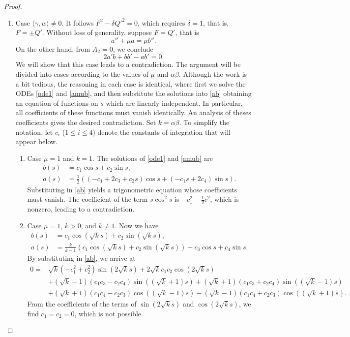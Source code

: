 \documentclass[a4paper,12pt]{amsart}
\theoremstyle{definition}
\begin{document}
\begin{proof}
\begin{enumerate}
\begin{enumerate}
\item Case  $\langle \gamma, w \rangle \neq 0$. It follows $F^2-\delta Q'^2=0$, which requires $\delta=1$, that is, $F=\pm Q'$. Without loss of generality, suppose $F=Q'$, that is
\begin{equation}
a''+\mu a=\mu b''. \label{amub}
\end{equation}
On the other hand, from $A_2=0$, we conclude
\begin{equation}
2a'b+bb'-ab'=0. \label{ab}
\end{equation}
We will show that this case leads to a contradiction. The argument will be divided into cases according to the values of $\mu$ and $\alpha\beta$. Although the work is a bit tedious, the reasoning in each case is identical, where first we   solve the ODEs \eqref{ode1} and \eqref{amub}, and then substitute the solutions into \eqref{ab} obtaining an equation of functions on $s$ which are linearly independent. In particular, all coefficients of these functions must vanish identically. An analysis of theses coefficients gives the desired contradiction. Set $k=\alpha\beta$. To simplify the notation, let $c_i$ ($1 \leq i \leq 4$) denote the constants of integration that will appear below.
\begin{enumerate}
\item Case $\mu=1$ and $k=1$. The solutions of \eqref{ode1} and \eqref{amub} are
\begin{equation*}
\begin{split}
b(s)&=c_1\cos s+c_2 \sin s,\\
a(s)&=\frac12 ((-c_1+2c_3+c_2s)\cos s+(-c_1s+2c_4)\sin s).
\end{split}
\end{equation*}
Substituting   in \eqref{ab} yields a trigonometric equation whose coefficients must vanish. The coefficient of the term $s \cos^2 s$ is $-c_1^2-\frac12 c^2$, which is nonzero, leading to a contradiction.

\item Case $\mu=1$, $k >0$, and $k\neq1$. Now we have
\begin{equation*}
\begin{split}
 b(s)&=c_1\cos (\sqrt{k}s)+c_2 \sin (\sqrt{k}s),\\
a(s)&=\frac{k }{k-1}(c_1 \cos (\sqrt{k} s)+c_2 \sin (\sqrt{k} s))+c_3 \cos s+c_4 \sin s.
\end{split}
\end{equation*}
By substituting   in \eqref{ab}, we arrive at
$$
\begin{aligned}
0=& \sqrt{k}(-c_1^2+c_2^2)\sin(2\sqrt{k}s)
+ 2\sqrt{k}c_1c_2\cos(2\sqrt{k}s) \\
&+ (\sqrt{k}-1)(c_1c_3-c_2c_4)\sin((\sqrt{k}+1)s)
+ (\sqrt{k}+1)(c_1c_3+c_2c_4)\sin((\sqrt{k}-1)s) \\
&+ (\sqrt{k}+1)(c_1c_4-c_2c_3)\cos((\sqrt{k}-1)s)
- (\sqrt{k}-1)(c_1c_4+c_2c_3)\cos((\sqrt{k}+1)s).
\end{aligned}
$$
From the coefficients of the terms of $\sin(2\sqrt{k}s)$ and $\cos(2\sqrt{k}s)$, we find $c_1=c_2=0$, which is not possible.


\end{enumerate}
\end{enumerate}
\end{enumerate}
\end{proof}
\end{document}
